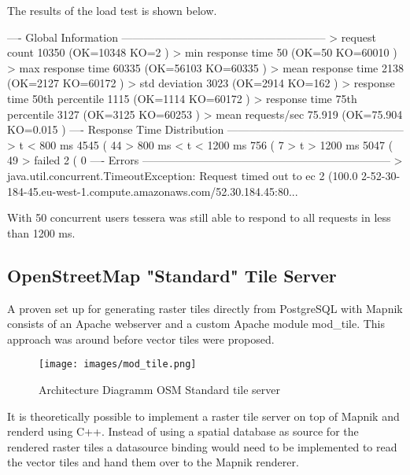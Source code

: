 The results of the load test is shown below.

\begin{bashcode}
---- Global Information --------------------------------------------------------
> request count                                      10350 (OK=10348  KO=2     )
> min response time                                     50 (OK=50     KO=60010 )
> max response time                                  60335 (OK=56103  KO=60335 )
> mean response time                                  2138 (OK=2127   KO=60172 )
> std deviation                                       3023 (OK=2914   KO=162   )
> response time 50th percentile                       1115 (OK=1114   KO=60172 )
> response time 75th percentile                       3127 (OK=3125   KO=60253 )
> mean requests/sec                                 75.919 (OK=75.904 KO=0.015 )
---- Response Time Distribution ------------------------------------------------
> t < 800 ms                                          4545 ( 44%
> 800 ms < t < 1200 ms                                 756 (  7%
> t > 1200 ms                                         5047 ( 49%
> failed                                                 2 (  0%
---- Errors --------------------------------------------------------------------
> java.util.concurrent.TimeoutException: Request timed out to ec      2 (100.0%
2-52-30-184-45.eu-west-1.compute.amazonaws.com/52.30.184.45:80...
\end{bashcode}

With 50 concurrent users tessera was still able to respond to all requests in less than 1200 ms.
\newpage

\subsection{OpenStreetMap "Standard" Tile Server}\label{osm_standard_tile_server}

A proven set up for generating raster tiles directly from PostgreSQL with Mapnik consists of an Apache webserver and a custom Apache module mod\_tile\cite{16_wiki.openstreetmap.org_2015}. This approach was around before vector tiles were proposed.

\begin{figure}[H]
\centering
  \texttt{[image: images/mod\_tile.png]}
  \caption{Architecture Diagramm OSM Standard tile server}
\end{figure}

It is theoretically possible to implement a raster tile server
on top of Mapnik and renderd using C++. Instead of using a spatial database as source for the rendered raster tiles a datasource binding would need to be implemented to read the vector tiles and hand them over to the Mapnik renderer. 

